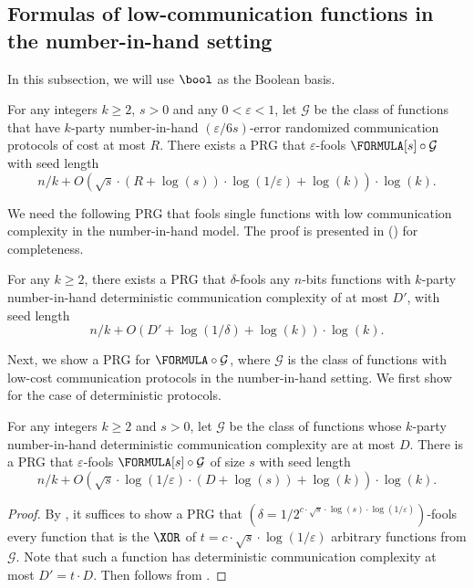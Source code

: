     \subsection{Formulas of low-communication functions in the number-in-hand setting}
    
    In this subsection, we will use $\bool$ as the Boolean basis.
    
	\begin{theorem}\label{thm:prg-formula-lc}
		For any integers $k\geq 2$, $s>0$ and any $0<\varepsilon<1$, let $\mathcal{G}$ be the class of functions that have $k$-party number-in-hand $(\varepsilon/6s)$-error randomized communication protocols of cost at most $R$. There exists a PRG that $\varepsilon$-fools $\FORMULA[s]\circ \mathcal{G}$ with seed length
		\[
			n/k+O\left(\sqrt{s}\cdot (R +\log (s))\cdot \log(1/\varepsilon) +\log(k)\right)\cdot\log(k).
		\]
	\end{theorem}
    
    We need the following PRG that fools single functions with low communication complexity in the number-in-hand model. The proof is presented in  () for completeness.

	\begin{theorem}\label{thm:prg-lc}
		For any $k\geq 2$, there exists a PRG that $\delta$-fools any $n$-bits functions with $k$-party number-in-hand deterministic communication complexity of at most $D'$, with seed length
		\[
			n/k+O\left(D' + \log(1/\delta)+\log(k)\right)\cdot\log(k).
		\]
	\end{theorem}

    Next, we show a PRG for $\FORMULA\circ\mathcal{G}$, where $\mathcal{G}$ is the class of functions with low-cost communication protocols in the number-in-hand setting. We first show for the case of deterministic protocols.
    
    \begin{theorem}\label{thm:prg-formula-lc-det}
		For any integers $k\geq 2$ and $s>0$, let $\mathcal{G}$ be the class of functions whose $k$-party number-in-hand deterministic communication complexity are at most $D$. There is a PRG that $\varepsilon$-fools $\FORMULA[s]\circ \mathcal{G}$ of size $s$ with seed length
		\[
			n/k+O\left(\sqrt{s}\cdot \log(1/\varepsilon)\cdot (D +\log (s)) +\log(k)\right)\cdot\log(k).
		\]
	\end{theorem}
	
	\begin{proof}
		By , it suffices to show a PRG that $\left(\delta=1/2^{c\cdot\sqrt{s}\cdot\log (s)\cdot \log(1/\varepsilon)}\right)$-fools every function that is the $\XOR$ of $t=c\cdot\sqrt{s}\cdot \log(1/\varepsilon)$ arbitrary functions from $\mathcal{G}$. Note that such a function has deterministic communication complexity at most $D'=t\cdot D$. Then  follows from .
	\end{proof}
	
